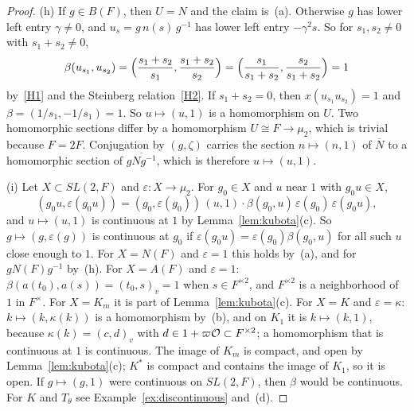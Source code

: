\begin{proof}
(h) If $g\in B(F)$, then $U=N$ and the claim is~(a). Otherwise $g$ has
lower left entry $\gamma\ne0$, and $u_s=g\,n(s)\,g^{-1}$ has lower left
entry $-\gamma^2s$. So for $s_1,s_2\ne0$ with $s_1+s_2\ne0$,
\[
\beta(u_{s_1},u_{s_2})
=\Bigl(\frac{s_1+s_2}{s_1},\frac{s_1+s_2}{s_2}\Bigr)
=\Bigl(\frac{s_1}{s_1+s_2},\frac{s_2}{s_1+s_2}\Bigr)=1
\]
by~\ref{H1} and the Steinberg relation~\ref{H2}. If $s_1+s_2=0$, then
$x(u_{s_1}u_{s_2})=1$ and $\beta=(1/s_1,-1/s_1)=1$. So $u\mapsto(u,1)$
is a homomorphism on $U$. Two homomorphic sections differ by a
homomorphism $U\cong F\to\mu_2$, which is trivial because
$F=2F$. Conjugation by $(g,\zeta)$ carries the section $n\mapsto(n,1)$
of $\overline N$ to a homomorphic section of $\overline{gNg^{-1}}$, which
is therefore $u\mapsto(u,1)$.

(i) Let $X\subset SL(2,F)$ and $\varepsilon\colon X\to\mu_2$. For
$g_0\in X$ and $u$ near $1$ with $g_0u\in X$,
\[
(g_0u,\varepsilon(g_0u))=(g_0,\varepsilon(g_0))\,(u,1)\cdot
\beta(g_0,u)\,\varepsilon(g_0)\,\varepsilon(g_0u),
\]
and $u\mapsto(u,1)$ is continuous at $1$ by Lemma~\ref{lem:kubota}(c). So
$g\mapsto(g,\varepsilon(g))$ is continuous at $g_0$ if
$\varepsilon(g_0u)=\varepsilon(g_0)\beta(g_0,u)$ for all such $u$ close
enough to $1$. For $X=N(F)$ and $\varepsilon=1$ this holds by~(a), and
for $gN(F)g^{-1}$ by~(h). For $X=A(F)$ and $\varepsilon=1$:
$\beta(a(t_0),a(s))=(t_0,s)_v=1$ when $s\in F^{\times2}$, and
$F^{\times2}$ is a neighborhood of $1$ in $F^\times$. For $X=K_m$ it is
part of Lemma~\ref{lem:kubota}(c). For $X=K$ and $\varepsilon=\kappa$:
$k\mapsto(k,\kappa(k))$ is a homomorphism by~(b), and on $K_1$ it is
$k\mapsto(k,1)$, because $\kappa(k)=(c,d)_v$ with $d\in1+\varpi\mathcal{O}\subset
F^{\times2}$; a homomorphism that is continuous at $1$ is continuous.
The image of $K_m$ is compact, and open by Lemma~\ref{lem:kubota}(c);
$K^*$ is compact and contains the image of $K_1$, so it is open. If $g\mapsto(g,1)$ were continuous on $SL(2,F)$, then
$\beta$ would be continuous. For $K$ and $T_\theta$ see
Example~\ref{ex:discontinuous} and~(d).
\end{proof}

